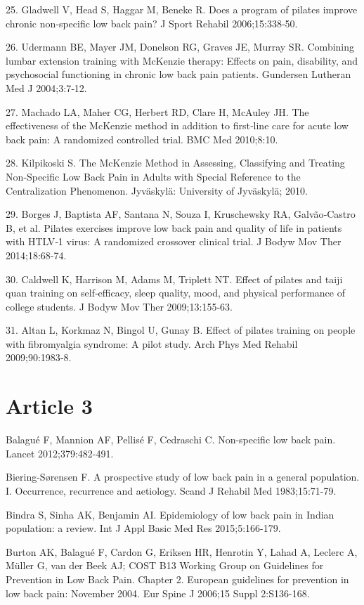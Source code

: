 \documentclass[a5paper]{article}
\theoremstyle{definition}
\begin{document}
25. Gladwell V, Head S, Haggar M, Beneke R. Does a program of
pilates improve chronic non‑specific low back pain? J Sport Rehabil
2006;15:338‑50.

26. Udermann BE, Mayer JM, Donelson RG, Graves JE, Murray SR.
Combining lumbar extension training with McKenzie therapy: Effects
on pain, disability, and psychosocial functioning in chronic low back
pain patients. Gundersen Lutheran Med J 2004;3:7‑12.

27. Machado LA, Maher CG, Herbert RD, Clare H, McAuley JH. The
effectiveness of the McKenzie method in addition to first‑line care
for acute low back pain: A randomized controlled trial. BMC Med
2010;8:10.

28. Kilpikoski S. The McKenzie Method in Assessing, Classifying and
Treating Non‑Specific Low Back Pain in Adults with Special Reference to
the Centralization Phenomenon. Jyväskylä: University of Jyväskylä; 2010.

29. Borges J, Baptista AF, Santana N, Souza I, Kruschewsky RA,
Galvão‑Castro B, et al. Pilates exercises improve low back pain and
quality of life in patients with HTLV‑1 virus: A randomized crossover
clinical trial. J Bodyw Mov Ther 2014;18:68‑74.

30. Caldwell K, Harrison M, Adams M, Triplett NT. Effect of pilates and
taiji quan training on self‑efficacy, sleep quality, mood, and physical
performance of college students. J Bodyw Mov Ther 2009;13:155‑63.

31. Altan L, Korkmaz N, Bingol U, Gunay B. Effect of pilates training
on people with fibromyalgia syndrome: A pilot study. Arch Phys Med
Rehabil 2009;90:1983‑8.
\section{Article 3}
Balagué F, Mannion AF, Pellisé F, Cedraschi C. Non-specific low back
pain. Lancet 2012;379:482-491.

Biering-Sørensen F. A prospective study of low back pain in a general
population. I. Occurrence, recurrence and aetiology. Scand J Rehabil
Med 1983;15:71-79.

Bindra S, Sinha AK, Benjamin AI. Epidemiology of low back pain in Indian population: a review. Int J Appl Basic Med Res 2015;5:166-179.

Burton AK, Balagué F, Cardon G, Eriksen HR, Henrotin Y, Lahad A, Leclerc A, Müller G, van der Beek AJ; COST B13 Working Group on
Guidelines for Prevention in Low Back Pain. Chapter 2. European
guidelines for prevention in low back pain: November 2004. Eur
Spine J 2006;15 Suppl 2:S136-168.
\end{document}
